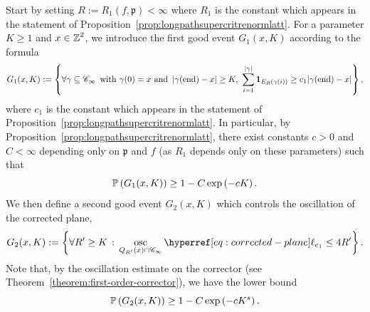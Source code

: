 \documentclass[12pt]{amsart}
\numberwithin{equation}{section}
\begin{document}
	Start by setting $R := R_1(f , \mathfrak{p}) < \infty$ where $R_1$ is the constant which appears in the statement of Proposition~\ref{prop:longpathsupercritrenormlatt}. For a parameter $K \geq 1$ and $x \in \Z^2$, we introduce the first good event $G_1(x , K)$ according to the formula
	\begin{equation} \label{eq:defG1}
		G_1(x , K)  := \left\{ \forall \gamma \subseteq \mathscr{C}_\infty \, \mbox{ with } \gamma(0) = x ~\mbox{and}~  \left| \gamma(\mathrm{end}) - x \right| \geq K , ~ \sum_{i = 1}^{|\gamma|} \indc_{E_R \left( \gamma(i) \right)} \geq c_1 | \gamma(\mathrm{end}) - x | \right\},  
	\end{equation}
	where $c_1$ is the constant which appears in the statement of Proposition~\ref{prop:longpathsupercritrenormlatt}. In particular, by Proposition~\ref{prop:longpathsupercritrenormlatt}, there exist constants $c > 0$ and $C < \infty$ depending only on $\mathfrak{p}$ and $f$ (as $R_1$ depends only on these parameters) such that
	\begin{equation} \label{eq:PG1goesto1}
		\P \left( G_1(x , K) \right) \geq 1 - C \exp \left( - c K \right).
	\end{equation}
	We then define a second good event $G_2(x , K)$ which controls the oscillation of the corrected plane,
	\begin{equation} \label{eq:corrector-oscillation}
		G_2(x,K) := \left\{ \forall R' \geq  K \, : \, \osc_{Q_{R'}(x) \cap \mathscr{C}_{\infty}} \ellp{e_1} \leq 4 R' \right\}.
	\end{equation}
	Note that, by the oscillation estimate on the corrector (see Theorem~\ref{theorem:first-order-corrector}), we have the lower bound
	\begin{equation} \label{eq:PG2goesto1}
		\P \left( G_2(x,K) \right) \geq 1 - C \exp \left( - c K^s \right).
	\end{equation}
\end{document}
